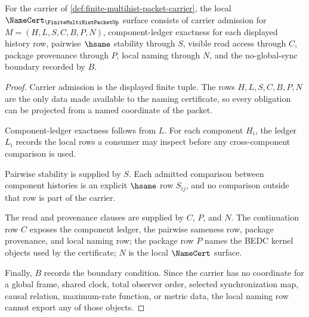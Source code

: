 \begin{theorem}
\label{thm:finite-multihist-packet-namecert-obligations}
For the carrier of \autoref{def:finite-multihist-packet-carrier}, the local $\NameCert_{\FiniteMultiHistPacketUp}$ surface consists of carrier admission for $M=(H,L,S,C,B,P,N)$, component-ledger exactness for each displayed history row, pairwise $\hsame$ stability through $S$, visible read access through $C$, package provenance through $P$, local naming through $N$, and the no-global-sync boundary recorded by $B$.
\end{theorem}
\begin{proof}
Carrier admission is the displayed finite tuple. The rows $H,L,S,C,B,P,N$ are the only data made available to the naming certificate, so every obligation can be projected from a named coordinate of the packet.

Component-ledger exactness follows from $L$. For each component $H_i$, the ledger $L_i$ records the local rows a consumer may inspect before any cross-component comparison is used.

Pairwise stability is supplied by $S$. Each admitted comparison between component histories is an explicit $\hsame$ row $S_{ij}$, and no comparison outside that row is part of the carrier.

The read and provenance clauses are supplied by $C$, $P$, and $N$. The continuation row $C$ exposes the component ledger, the pairwise sameness row, package provenance, and local naming row; the package row $P$ names the BEDC kernel objects used by the certificate; $N$ is the local $\NameCert$ surface.

Finally, $B$ records the boundary condition. Since the carrier has no coordinate for a global frame, shared clock, total observer order, selected synchronization map, causal relation, maximum-rate function, or metric data, the local naming row cannot export any of those objects.
\end{proof}

